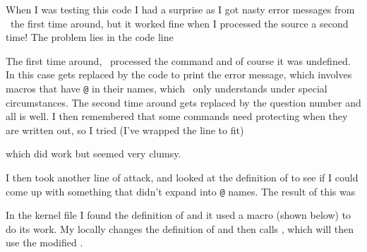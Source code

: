 {{{{    When I was testing this code I had a surprise as I got nasty error messages
from \ltx\ the first time around, but it worked fine when I processed the
source a second time! The problem lies in the code line
\begin{lcode}
%
\end{lcode}  

    The first time around, \ltx\ processed the \cmd{\ref} command and of
course it was undefined. In this case \cmd{\ref} gets replaced by the
code to print the error message, which involves macros that have \texttt{@}
in their names, which \ltx\ only understands under special circumstances.
The second time around \cmd{\ref} gets replaced by the question number
and all is well. I then remembered that some commands need 
protecting
when they are written out, so I tried (I've wrapped the line to fit)
\begin{lcode}
%
\end{lcode}  
which did work but seemed very clumsy.

    I then took another line of attack, and looked at the definition
of \cmd{\ref} to see if I could come up with something that didn't
expand into \texttt{@} names. The result of this was
\begin{lcode}
%
\end{lcode}  
In the kernel file  I found the definition of \cmd{\ref}
and it used a macro \cmd{\@setref} (shown below) to do its work.
My \cmd{\quietref} locally changes the definition of \cmd{\@setref} 
and then calls \cmd{\ref}, which will then use the modified \cmd{\@setref}.
\begin{lcode}
\def\@setref#1#2#3{%
  \ifx#1\relax
    \protect\G@refundefinedtrue
    \nfss@text{\reset@font\bfseries ??}%
    \@latex@warning{Reference `#3' on page \thepage \space
                    undefined}%
  \else
    \expandafter#2#1\null
  \fi}

\DeclareRobustCommand{\quietref}[1]{\begingroup
  \def\@setref##1##2##3{%
    \ifx##1\relax ??\else
      \expandafter##2##1\null
    \fi
  \ref{#1}\endgroup}
\end{lcode}

}}}}
